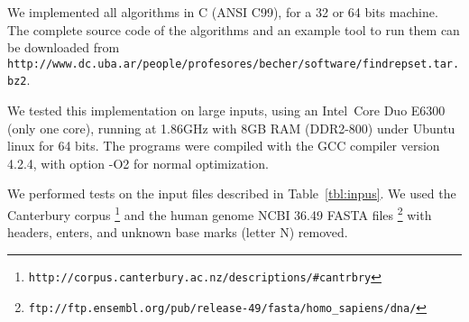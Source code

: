 \documentclass[submission]{dmtcs}
\newcommand\+[1]{\mathcal{#1}}
\begin{document}
We implemented all algorithms in C (ANSI C99), for a
32 or 64 bits machine. The complete source code of the algorithms and an
example tool to run them can be downloaded from\\
\texttt{\small http://www.dc.uba.ar/people/profesores/becher/software/findrepset.tar.bz2}.

We tested this implementation on large inputs, using an
Intel\textregistered\ Core Duo E6300 (only one core),
running at 1.86GHz with 8GB RAM (DDR2-800) under Ubuntu linux for 64 bits.
The programs were compiled with the GCC compiler version 4.2.4, 
with option -O2 for normal optimization. 

We performed tests on the input files described in Table~\ref{tbl:inpus}.
We used the Canterbury corpus \footnote{\texttt{\small http://corpus.canterbury.ac.nz/descriptions/\#cantrbry}}
and the human genome NCBI 36.49 FASTA files \footnote{\texttt{\small ftp://ftp.ensembl.org/pub/release-49/fasta/homo\_sapiens/dna/}} with headers, enters, and unknown base marks (letter N) removed.
\end{document}
